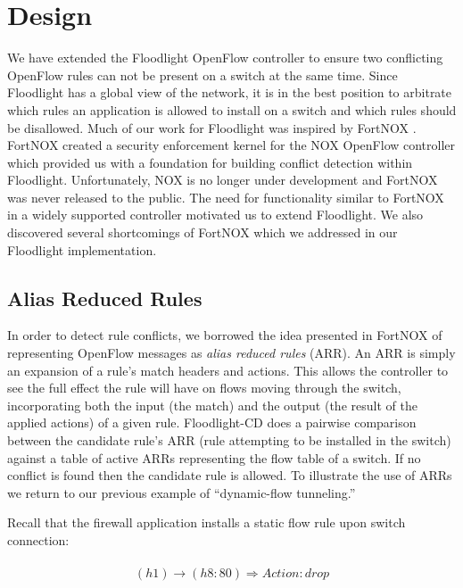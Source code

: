 \section{Design}
\label{sec:design}

We have extended the Floodlight OpenFlow controller to ensure two conflicting OpenFlow rules can not be present on a switch at the same time.
Since Floodlight has a global view of the network, it is in the best position to arbitrate which rules an application is allowed to install on a switch and which rules should be disallowed.
Much of our work for Floodlight was inspired by FortNOX \cite{Porras:2012:SEK:2342441.2342466}.
FortNOX created a security enforcement kernel for the NOX OpenFlow controller \cite{Gude:2008:NTO:1384609.1384625} which provided us with a foundation for building conflict detection within
Floodlight.
Unfortunately, NOX is no longer under development and FortNOX was never released to the public.
The need for functionality similar to FortNOX in a widely supported controller motivated us to extend Floodlight.
We also discovered several shortcomings of FortNOX which we addressed in our Floodlight implementation.

\subsection{Alias Reduced Rules}
\label{subsec:arr}
In order to detect rule conflicts, we borrowed the idea presented in FortNOX of representing OpenFlow messages as \emph{alias reduced rules} (ARR).
An ARR is simply an expansion of a rule's match headers and actions.
This allows the controller to see the full effect the rule will have on flows moving through the switch, incorporating both the input (the match) and the output (the result of the applied actions) of a given rule.
Floodlight-CD does a pairwise comparison between the candidate rule's ARR (rule attempting to be installed in the switch) against a table of active ARRs representing the flow table of a switch.
If no conflict is found then the candidate rule is allowed.
To illustrate the use of ARRs we return to our previous example of ``dynamic-flow tunneling.'' 

Recall that the firewall application installs a static flow rule upon switch connection:

\begin{align}
\begin{aligned}
\label{eq:staticfirewall}
(h1) \rightarrow (h8:80) \Rightarrow Action: drop 
\end{aligned}
\end{align}

